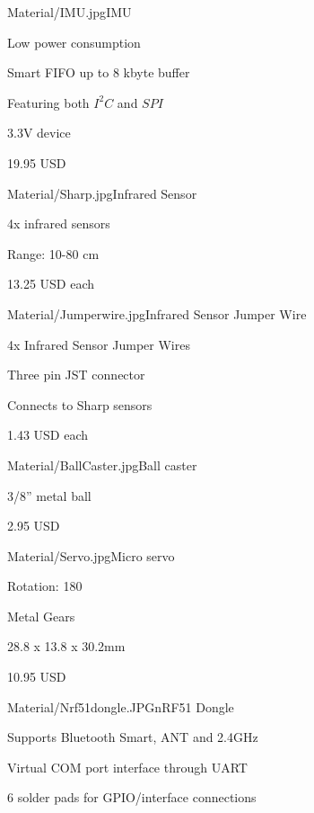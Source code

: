 \begin{material}{Material/IMU.jpg}{IMU}
\item Low power consumption
\item Smart FIFO up to 8 kbyte buffer
\item Featuring both $I^2C$ and $SPI$
\item 3.3V device
\item 19.95 USD
\end{material}

\begin{material}{Material/Sharp.jpg}{Infrared Sensor}
\item 4x infrared sensors
\item Range: 10-80 cm
\item 13.25 USD each
\end{material}

\newpage
{}
\begin{material}{Material/Jumperwire.jpg}{Infrared Sensor Jumper Wire}
\item 4x Infrared Sensor Jumper Wires
\item Three pin JST connector
\item Connects to Sharp sensors
\item 1.43 USD each
\end{material}

\begin{material}{Material/BallCaster.jpg}{Ball caster}
\item 3/8'' metal ball
\item 2.95 USD
\end{material}

\begin{material}{Material/Servo.jpg}{Micro servo}
\item Rotation: 180\degree
\item Metal Gears
\item 28.8 x 13.8 x 30.2mm
\item 10.95 USD
\end{material}

\newpage
{}
\begin{material}{Material/Nrf51dongle.JPG}{nRF51 Dongle}
\item Supports Bluetooth Smart, ANT and 2.4GHz
\item Virtual COM port interface through UART
\item 6 solder pads for GPIO/interface connections
\end{material}

